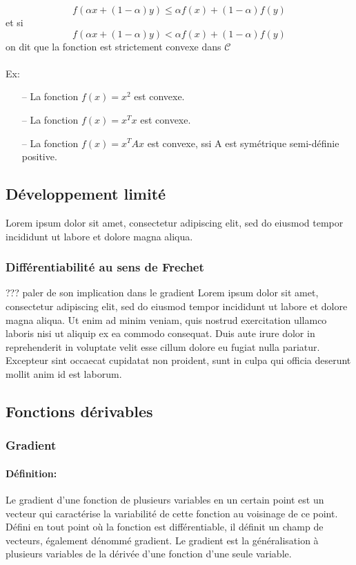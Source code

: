 	\begin{equation}
	f(\alpha x + (1 - \alpha)y) \leq \alpha f(x) + (1 - \alpha)f(y)
	\label{eq_convexe-1}
	\end{equation}
	et si
	\begin{equation}
	f(\alpha x + (1 - \alpha)y) < \alpha f(x) + (1 - \alpha)f(y)
	\label{eq_convexe-2}
	\end{equation}
	on dit que la fonction est strictement convexe dans $\mathcal{C}$\\\\
	Ex:
	\begin{itemize}
	\item[--] La fonction $ f(x) = x^2$ est convexe.
	\item[--] La fonction $ f(x) = x^T x$ est convexe.
	\item[--] La fonction $ f(x) = x^T Ax$ est convexe, ssi A est symétrique semi-définie positive.
	\end{itemize}
	
	
	\subsection{Développement limité}\label{dev_lim}
	Lorem ipsum dolor sit amet, consectetur adipiscing elit, sed do eiusmod tempor incididunt ut labore et dolore magna aliqua.
	\subsubsection{Différentiabilité au sens de Frechet}
	??? paler de son implication dans le gradient
	Lorem ipsum dolor sit amet, consectetur adipiscing elit, sed do eiusmod tempor incididunt ut labore et dolore magna aliqua. Ut enim ad minim veniam, quis nostrud exercitation ullamco laboris nisi ut aliquip ex ea commodo consequat. Duis aute irure dolor in reprehenderit in voluptate velit esse cillum dolore eu fugiat nulla pariatur. Excepteur sint occaecat cupidatat non proident, sunt in culpa qui officia deserunt mollit anim id est laborum.
	
	\subsection{Fonctions dérivables}
	
	\subsubsection{Gradient}\label{grad}
	\paragraph*{Définition:}Le gradient d'une fonction de plusieurs variables en un certain point est un vecteur qui caractérise la variabilité de cette fonction au voisinage de ce point. Défini en tout point où la fonction est différentiable, il définit un champ de vecteurs, également dénommé gradient. Le gradient est la généralisation à plusieurs variables de la dérivée d'une fonction d'une seule variable.\\ \\

